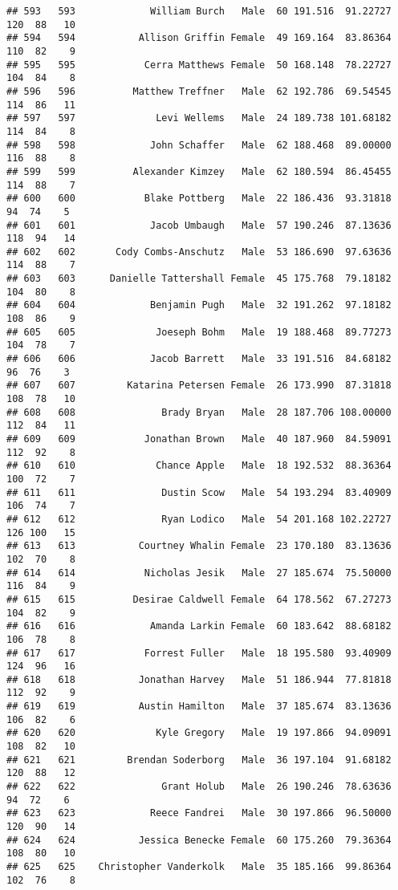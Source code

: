\documentclass[
]{article}
\begin{document}
\begin{verbatim}
## 593   593             William Burch   Male  60 191.516  91.22727 120  88   10
## 594   594           Allison Griffin Female  49 169.164  83.86364 110  82    9
## 595   595            Cerra Matthews Female  50 168.148  78.22727 104  84    8
## 596   596          Matthew Treffner   Male  62 192.786  69.54545 114  86   11
## 597   597              Levi Wellems   Male  24 189.738 101.68182 114  84    8
## 598   598             John Schaffer   Male  62 188.468  89.00000 116  88    8
## 599   599          Alexander Kimzey   Male  62 180.594  86.45455 114  88    7
## 600   600            Blake Pottberg   Male  22 186.436  93.31818  94  74    5
## 601   601             Jacob Umbaugh   Male  57 190.246  87.13636 118  94   14
## 602   602       Cody Combs-Anschutz   Male  53 186.690  97.63636 114  88    7
## 603   603      Danielle Tattershall Female  45 175.768  79.18182 104  80    8
## 604   604             Benjamin Pugh   Male  32 191.262  97.18182 108  86    9
## 605   605              Joeseph Bohm   Male  19 188.468  89.77273 104  78    7
## 606   606             Jacob Barrett   Male  33 191.516  84.68182  96  76    3
## 607   607         Katarina Petersen Female  26 173.990  87.31818 108  78   10
## 608   608               Brady Bryan   Male  28 187.706 108.00000 112  84   11
## 609   609            Jonathan Brown   Male  40 187.960  84.59091 112  92    8
## 610   610              Chance Apple   Male  18 192.532  88.36364 100  72    7
## 611   611               Dustin Scow   Male  54 193.294  83.40909 106  74    7
## 612   612               Ryan Lodico   Male  54 201.168 102.22727 126 100   15
## 613   613           Courtney Whalin Female  23 170.180  83.13636 102  70    8
## 614   614            Nicholas Jesik   Male  27 185.674  75.50000 116  84    9
## 615   615          Desirae Caldwell Female  64 178.562  67.27273 104  82    9
## 616   616             Amanda Larkin Female  60 183.642  88.68182 106  78    8
## 617   617            Forrest Fuller   Male  18 195.580  93.40909 124  96   16
## 618   618           Jonathan Harvey   Male  51 186.944  77.81818 112  92    9
## 619   619           Austin Hamilton   Male  37 185.674  83.13636 106  82    6
## 620   620              Kyle Gregory   Male  19 197.866  94.09091 108  82   10
## 621   621         Brendan Soderborg   Male  36 197.104  91.68182 120  88   12
## 622   622               Grant Holub   Male  26 190.246  78.63636  94  72    6
## 623   623             Reece Fandrei   Male  30 197.866  96.50000 120  90   14
## 624   624           Jessica Benecke Female  60 175.260  79.36364 108  80   10
## 625   625    Christopher Vanderkolk   Male  35 185.166  99.86364 102  76    8

\end{verbatim}
\end{document}
